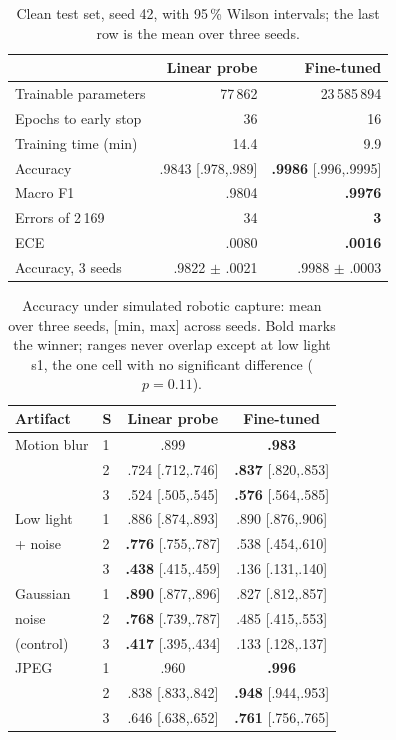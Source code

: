 \documentclass[10pt,a4paper,twocolumn]{article}
\begin{document}
\begin{table}[t]
\centering
\caption{Clean test set, seed 42, with 95\,\% Wilson intervals; the last row is the mean over three
seeds.}
\label{tab:clean}
\small
\begin{tabular}{lrr}
\toprule
& \textbf{Linear probe} & \textbf{Fine-tuned} \\
\midrule
Trainable parameters & 77\,862 & 23\,585\,894 \\
Epochs to early stop & 36 & 16 \\
Training time (min) & 14.4 & 9.9 \\
\midrule
Accuracy & .9843 [.978,.989] & \textbf{.9986} [.996,.9995] \\
Macro F1 & .9804 & \textbf{.9976} \\
Errors of 2\,169 & 34 & \textbf{3} \\
ECE & .0080 & \textbf{.0016} \\
\midrule
Accuracy, 3 seeds & .9822 $\pm$ .0021 & .9988 $\pm$ .0003 \\
\bottomrule
\end{tabular}
\end{table}

\begin{table}[t]
\centering
\caption{Accuracy under simulated robotic capture: mean over three seeds, [min, max] across seeds.
Bold marks the winner; ranges never overlap except at low light s1, the one cell with no significant
difference ($p=0.11$).}
\label{tab:robust}
\footnotesize
\begin{tabular}{llcc}
\toprule
\textbf{Artifact} & \textbf{S} & \textbf{Linear probe} & \textbf{Fine-tuned} \\
\midrule
Motion blur & 1 & .899 & \textbf{.983} \\
            & 2 & .724 [.712,.746] & \textbf{.837} [.820,.853] \\
            & 3 & .524 [.505,.545] & \textbf{.576} [.564,.585] \\
\midrule
Low light   & 1 & .886 [.874,.893] & .890 [.876,.906] \\
+ noise     & 2 & \textbf{.776} [.755,.787] & .538 [.454,.610] \\
            & 3 & \textbf{.438} [.415,.459] & .136 [.131,.140] \\
\midrule
Gaussian    & 1 & \textbf{.890} [.877,.896] & .827 [.812,.857] \\
noise       & 2 & \textbf{.768} [.739,.787] & .485 [.415,.553] \\
(control)   & 3 & \textbf{.417} [.395,.434] & .133 [.128,.137] \\
\midrule
JPEG        & 1 & .960 & \textbf{.996} \\
            & 2 & .838 [.833,.842] & \textbf{.948} [.944,.953] \\
            & 3 & .646 [.638,.652] & \textbf{.761} [.756,.765] \\
\bottomrule
\end{tabular}
\end{table}
\end{document}
